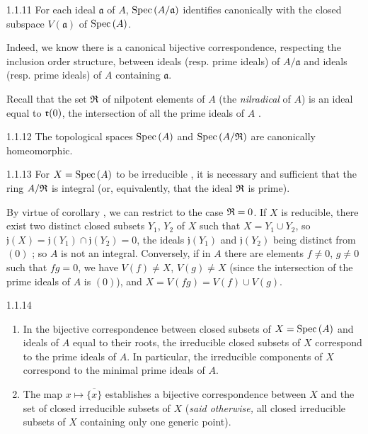 \begin{envs}[Proposition]{1.1.11}
\label{prop-1.1.1.11}
For each ideal $\mathfrak{a}$ of $A$, ${\mathop{\mathrm{Spec}}\nolimits}\,(A/\mathfrak{a})$ identifies canonically with the
closed subspace $V(\mathfrak{a})$ of ${\mathop{\mathrm{Spec}}\nolimits}\,(A)$.
\end{envs}

Indeed, we know there is a canonical bijective correspondence, respecting the inclusion order
structure, between ideals (resp. prime ideals) of $A/\mathfrak{a}$ and ideals (resp. prime
ideals) of $A$ containing $\mathfrak{a}$.

Recall that the set $\mathfrak{R}$ of nilpotent elements of $A$ (the \emph{nilradical} of $A$) is
an ideal equal to $\mathfrak{r}(0)$, the intersection of all the prime ideals of $A$
.

\begin{envs}[Corollary]{1.1.12}
\label{cor-1.1.1.12}
The topological spaces ${\mathop{\mathrm{Spec}}\nolimits}\,(A)$ and ${\mathop{\mathrm{Spec}}\nolimits}\,(A/\mathfrak{R})$ are canonically homeomorphic.
\end{envs}

\begin{envs}[Proposition]{1.1.13}
\label{prop-1.1.1.13}
For $X={\mathop{\mathrm{Spec}}\nolimits}\,(A)$ to be irreducible , it is necessary and sufficient that the
ring $A/\mathfrak{R}$ is integral (or, equivalently, that the ideal $\mathfrak{R}$ is prime).
\end{envs}

By virtue of corollary , we can restrict to the case $\mathfrak{R}=0$. If $X$ is
reducible, there exist two distinct closed subsets $Y_1$, $Y_2$ of $X$ such that
$X=Y_1\cup Y_2$, so $\mathfrak{j}(X)=\mathfrak{j}(Y_1)\cap\mathfrak{j}(Y_2)=0$, the ideals
$\mathfrak{j}(Y_1)$ and $\mathfrak{j}(Y_2)$ being distinct from $(0)$ ; so
$A$ is not an integral. Conversely, if in $A$ there are elements $f\neq 0$, $g\neq 0$ such
that $fg=0$, we have $V(f)\neq X$, $V(g)\neq X$ (since the intersection of the prime ideals
of $A$ is $(0)$), and $X=V(fg)=V(f)\cup V(g)$.

\begin{envs}[Corollary]{1.1.14}
\label{cor-1.1.1.14}
\begin{enumerate}[label=\rm{(\roman*)}]
  \item In the bijective correspondence between closed subsets of $X={\mathop{\mathrm{Spec}}\nolimits}\,(A)$
        and ideals of $A$ equal to their roots, the irreducible closed subsets
        of $X$ correspond to the prime ideals of $A$. In particular, the irreducible
        components of $X$ correspond to the minimal prime ideals of $A$.
  \item The map $x\mapsto\overline{\{x\}}$ establishes a bijective correspondence
        between $X$ and the set of closed irreducible subsets of $X$
        (\emph{said otherwise,} all closed irreducible subsets of $X$ containing
        only one generic point).
\end{enumerate}
\end{envs}

